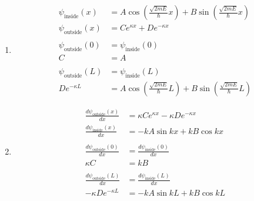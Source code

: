 \documentclass{article}
\begin{document}
\begin{enumerate}
  \item

        \begin{align*}
          \psi_\text{inside}(x)  & = A \cos \left( \frac{\sqrt{2 m E}}{\hbar} x \right) + B \sin \left( \frac{\sqrt{2 m E}}{\hbar} x \right) \\
          \psi_\text{outside}(x) & = C e^{\kappa x} + D e^{-\kappa x}                                                                        \\ \\
          \psi_\text{outside}(0) & = \psi_\text{inside}(0)                                                                                   \\
          C                      & = A                                                                                                       \\ \\
          \psi_\text{outside}(L) & = \psi_\text{inside}(L)                                                                                   \\
          D e^{-\kappa L}        & = A \cos \left( \frac{\sqrt{2 m E}}{\hbar} L \right) + B \sin \left( \frac{\sqrt{2 m E}}{\hbar} L \right)
        \end{align*}

  \item

        \begin{align*}
          \frac{d \psi_\text{outside}(x)}{d x} & = \kappa C e^{\kappa x} - \kappa D e^{-\kappa x} \\
          \frac{d \psi_\text{inside}(x)}{d x}  & = -k A \sin k x + k B \cos k x                   \\ \\
          \frac{d \psi_\text{outside}(0)}{d x} & = \frac{d \psi_\text{inside}(0)}{d x}            \\
          \kappa C                             & = k B                                            \\ \\
          \frac{d \psi_\text{outside}(L)}{d x} & = \frac{d \psi_\text{inside}(L)}{d x}            \\
          -\kappa D e^{-\kappa L}              & = -k A \sin k L + k B \cos k L
        \end{align*}
\end{enumerate}
\end{document}
